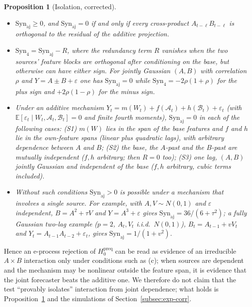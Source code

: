 \documentclass[pdflatex,sn-mathphys-ay]{sn-jnl}%
\theoremstyle{thmstyleone}%
\newtheorem{proposition}[theorem]{Proposition}%
\theoremstyle{thmstyletwo}%
\theoremstyle{thmstylethree}%
\newcommand{\E}{\mathbb{E}}
\newcommand{\Syn}{\mathrm{Syn}}
\begin{document}
\begin{proposition}[Isolation, corrected]\label{prop:isolation}
\begin{itemize}
\item[(a)] $\Syn_{\mathrm{aj}}\ge0$, and $\Syn_{\mathrm{aj}}=0$ if and only if every cross-product
$A_{t-\ell}B_{t-\ell}$ is orthogonal to the residual of the additive projection.
\item[(b)] $\Syn_4=\Syn_{\mathrm{aj}}-R$, where the redundancy term $R$ vanishes when the two
sources' feature blocks are orthogonal after conditioning on the base, but otherwise can have
either sign. For jointly Gaussian $(A,B)$ with correlation $\rho$ and $Y=A\pm B+\varepsilon$ one
has $\Syn_{\mathrm{aj}}=0$ while $\Syn_4=-2\rho(1+\rho)$ for the plus sign and $+2\rho(1-\rho)$ for the minus sign.
\item[(c)] Under an additive mechanism $Y_t=m(W_t)+f(\mathcal A_t)+h(\mathcal B_t)+\varepsilon_t$ (with $\E[\varepsilon_t\mid W_t,\mathcal A_t,\mathcal B_t]=0$ and finite fourth moments),
$\Syn_{\mathrm{aj}}=0$ in each of the following cases: (S1) $m(W)$ lies in the span of the base features and $f$ and $h$ lie in the own-feature
spans (linear plus quadratic lags), with arbitrary dependence between $A$ and $B$; (S2) the
base, the $A$-past and the $B$-past are mutually independent ($f,h$ arbitrary; then $R=0$ too);
(S3) one lag, $(A,B)$ jointly Gaussian and independent of the base ($f,h$ arbitrary, cubic terms included).
\item[(d)] Without such conditions $\Syn_{\mathrm{aj}}>0$ is possible under a mechanism that
involves a single source. For example, with $A,V\sim N(0,1)$ and $\varepsilon$ independent, $B=A^2+\tau V$ and $Y=A^3+\varepsilon$ gives
$\Syn_{\mathrm{aj}}=36/(6+\tau^2)$; a fully Gaussian two-lag example ($p=2$, $A_t,V_t$ i.i.d.\ $N(0,1)$), $B_t=A_{t-1}+vV_t$ and
$Y_t=A_{t-1}A_{t-2}+\varepsilon_t$, gives $\Syn_{\mathrm{aj}}=1/(1+v^2)$.
\end{itemize}
\end{proposition}

Hence an e-process rejection of $H_0^{\mathrm{preq}}$ can be read as evidence of an irreducible
$A\times B$ interaction only under conditions such as (c); when sources are dependent and the
mechanism may be nonlinear outside the feature span, it is evidence that the joint
forecaster beats the additive one. We therefore do not claim that the test ``provably isolates'' interaction from joint dependence; what holds is Proposition~\ref{prop:isolation}
and the simulations of Section~\ref{subsec:exp-corr}.
\end{document}
